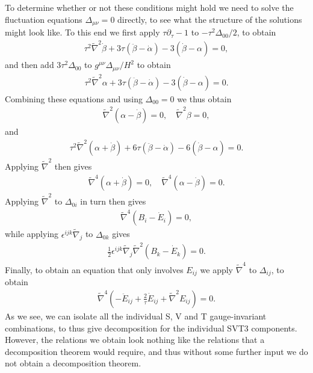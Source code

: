 To determine whether or not these conditions might hold we need to solve the fluctuation equations $\Delta_{\mu\nu}=0$ directly, to see what the structure of the solutions might look like.  To this end we first apply $\tau\partial_{\tau}-1$ to $-\tau^2\Delta_{00}/2$,  to obtain
%
\begin{eqnarray}
\tau^2\tilde{\nabla}^2\dot{\beta}+3\tau(\ddot{\beta}-\dot{\alpha})-3(\dot{\beta}-\alpha)=0,
\label{7.9}
\end{eqnarray}
%
and then add $3\tau^2\Delta_{00}$ to  $g^{\mu\nu}\Delta_{\mu\nu}/H^2$ to obtain
%
\begin{eqnarray}
\tau^2\tilde{\nabla}^2\alpha+3\tau(\ddot{\beta}-\dot{\alpha})-3(\dot{\beta}-\alpha)=0.
\label{7.10}
\end{eqnarray}
%
Combining these equations and using $\Delta_{00}=0$ we thus obtain
%
\begin{eqnarray}
\tilde{\nabla}^2(\alpha-\dot{\beta})=0,\quad \tilde{\nabla}^2\beta=0,
\label{7.11}
\end{eqnarray}
%
and 
%
\begin{eqnarray}
\tau^2\tilde{\nabla}^2(\alpha+\dot{\beta})+6\tau(\ddot{\beta}-\dot{\alpha})-6(\dot{\beta}-\alpha)=0.
\label{7.12}
\end{eqnarray}
%
Applying $\tilde{\nabla}^2$ then gives
%
\begin{eqnarray}
\tilde{\nabla}^4(\alpha+\dot{\beta})=0,\quad \tilde{\nabla}^4(\alpha-\dot{\beta})=0.
\label{7.13}
\end{eqnarray}
%
Applying $\tilde{\nabla}^2$ to $\Delta_{0i}$ in turn then gives
%
\begin{eqnarray}
\tilde{\nabla}^4(B_i-\dot{E}_i)=0,
\label{7.14}
\end{eqnarray}
%
while applying $\epsilon^{ijk}\tilde{\nabla}_j$ to $\Delta_{0k}$ gives
%
\begin{eqnarray}
\frac{1}{2}\epsilon^{ijk}\tilde{\nabla}_j\tilde{\nabla}^2(B_k-\dot{E}_k)=0.
\label{7.15}
\end{eqnarray}
%
Finally, to obtain an equation that only involves $E_{ij}$ we apply $\tilde{\nabla}^4$ to $\Delta_{ij}$, to obtain
%
\begin{eqnarray}
\tilde{\nabla}^4\left(-\ddot{E}_{ij}+\frac{2}{\tau}\dot{E}_{ij}+\tilde{\nabla}^2E_{ij}\right)=0.
\label{7.16}
\end{eqnarray}
%
As we see, we can isolate all the individual S, V and T gauge-invariant combinations, to thus give decomposition for the individual SVT3 components. However, the relations we obtain look nothing like the relations that a decomposition theorem would require, and thus without some further input we do not obtain a decomposition theorem.

